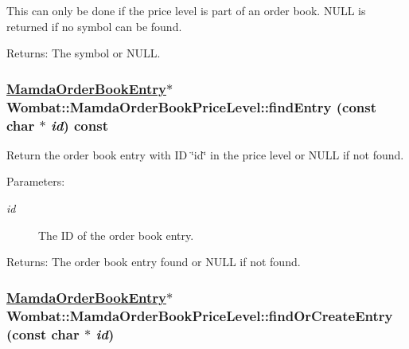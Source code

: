This can only be done if the price level is part of an order book. NULL is returned if no symbol can be found.

\begin{Desc}
\item[Returns:]The symbol or NULL. \end{Desc}
\hypertarget{classWombat_1_1MamdaOrderBookPriceLevel_107fd7232398ee854da1c8cbae0acb88}{
\subsubsection[findEntry]{\setlength{\rightskip}{0pt plus 5cm}\hyperlink{classWombat_1_1MamdaOrderBookEntry}{Mamda\-Order\-Book\-Entry}$\ast$ Wombat::Mamda\-Order\-Book\-Price\-Level::find\-Entry (const char $\ast$ {\em id}) const}}
\label{classWombat_1_1MamdaOrderBookPriceLevel_107fd7232398ee854da1c8cbae0acb88}


Return the order book entry with ID \char`\"{}id\char`\"{} in the price level or NULL if not found. 

\begin{Desc}
\item[Parameters:]
\begin{description}
\item[{\em id}]The ID of the order book entry. \end{description}
\end{Desc}
\begin{Desc}
\item[Returns:]The order book entry found or NULL if not found. \end{Desc}
\hypertarget{classWombat_1_1MamdaOrderBookPriceLevel_17859a5dd71e73c98f85383e908f36c6}{
\subsubsection[findOrCreateEntry]{\setlength{\rightskip}{0pt plus 5cm}\hyperlink{classWombat_1_1MamdaOrderBookEntry}{Mamda\-Order\-Book\-Entry}$\ast$ Wombat::Mamda\-Order\-Book\-Price\-Level::find\-Or\-Create\-Entry (const char $\ast$ {\em id})}}
\label{classWombat_1_1MamdaOrderBookPriceLevel_17859a5dd71e73c98f85383e908f36c6}


